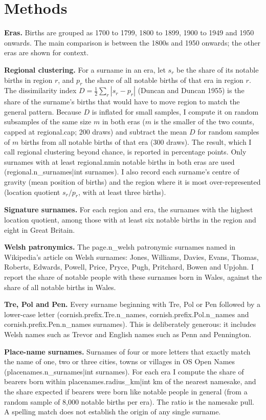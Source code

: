 \documentclass[11pt,a4paper]{article}
\begin{document}
\section{Methods}

\textbf{Eras.} Births are grouped as 1700 to 1799, 1800 to 1899, 1900 to 1949 and 1950 onwards. The main comparison is between the 1800s and 1950 onwards; the other eras are shown for context.

\textbf{Regional clustering.} For a surname in an era, let $s_r$ be the share of its notable births in region $r$, and $p_r$ the share of all notable births of that era in region $r$. The dissimilarity index $D = \frac{1}{2}\sum_r |s_r - p_r|$ (Duncan and Duncan 1955) is the share of the surname's births that would have to move region to match the general pattern. Because $D$ is inflated for small samples, I compute it on random subsamples of the same size $m$ in both eras ($m$ is the smaller of the two counts, capped at {{regional.cap}}; 200 draws) and subtract the mean $D$ for random samples of $m$ births from all notable births of that era (300 draws). The result, which I call regional clustering beyond chance, is reported in percentage points. Only surnames with at least {{regional.nmin}} notable births in both eras are used ({{regional.n_surnames|int}} surnames). I also record each surname's centre of gravity (mean position of births) and the region where it is most over-represented (location quotient $s_r / p_r$, with at least three births).

\textbf{Signature surnames.} For each region and era, the surnames with the highest location quotient, among those with at least six notable births in the region and eight in Great Britain.

\textbf{Welsh patronymics.} The {{page.n_welsh}} patronymic surnames named in Wikipedia's article on Welsh surnames: Jones, Williams, Davies, Evans, Thomas, Roberts, Edwards, Powell, Price, Pryce, Pugh, Pritchard, Bowen and Upjohn. I report the share of notable people with these surnames born in Wales, against the share of all notable births in Wales.

\textbf{Tre, Pol and Pen.} Every surname beginning with Tre, Pol or Pen followed by a lower-case letter ({{cornish.prefix.Tre.n_names}}, {{cornish.prefix.Pol.n_names}} and {{cornish.prefix.Pen.n_names}} surnames). This is deliberately generous: it includes Welsh names such as Trevor and English names such as Penn and Pennington.

\textbf{Place-name surnames.} Surnames of four or more letters that exactly match the name of one, two or three cities, towns or villages in OS Open Names ({{placenames.n_surnames|int}} surnames). For each era I compute the share of bearers born within {{placenames.radius_km|int}} km of the nearest namesake, and the share expected if bearers were born like notable people in general (from a random sample of 8,000 notable births per era). The ratio is the namesake pull. A spelling match does not establish the origin of any single surname.
\end{document}
